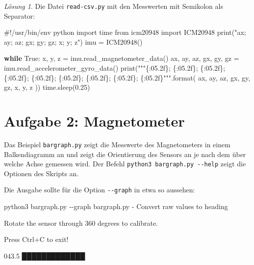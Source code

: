 \documentclass[
  11pt,
  a4paper,
  oneside, openany  ,captions=tableheading
]{scrbook}
\newenvironment{Shaded}{\begin{snugshade}}{\end{snugshade}}
\newcommand{\AttributeTok}[1]{\textcolor[rgb]{0.40,0.45,0.13}{#1}}
\newcommand{\BuiltInTok}[1]{\textcolor[rgb]{0.00,0.23,0.31}{#1}}
\newcommand{\CommentTok}[1]{\textcolor[rgb]{0.37,0.37,0.37}{#1}}
\newcommand{\ControlFlowTok}[1]{\textcolor[rgb]{0.00,0.23,0.31}{\textbf{#1}}}
\newcommand{\ExtensionTok}[1]{\textcolor[rgb]{0.00,0.23,0.31}{#1}}
\newcommand{\FloatTok}[1]{\textcolor[rgb]{0.68,0.00,0.00}{#1}}
\newcommand{\ImportTok}[1]{\textcolor[rgb]{0.00,0.46,0.62}{#1}}
\newcommand{\NormalTok}[1]{\textcolor[rgb]{0.00,0.23,0.31}{#1}}
\newcommand{\OperatorTok}[1]{\textcolor[rgb]{0.37,0.37,0.37}{#1}}
\newcommand{\SpecialCharTok}[1]{\textcolor[rgb]{0.37,0.37,0.37}{#1}}
\newcommand{\StringTok}[1]{\textcolor[rgb]{0.13,0.47,0.30}{#1}}
\newcommand{\VariableTok}[1]{\textcolor[rgb]{0.07,0.07,0.07}{#1}}
\theoremstyle{remark}
\newtheorem*{solution}{Lösung}
\renewcommand{\markright}[1]{\def\chaptertitle{#1}} %
\begin{document}
\begin{solution}
Die Datei \texttt{read-csv.py} mit den Messwerten mit Semikolon als
Separator:

\begin{Shaded}
\begin{Highlighting}[]
\CommentTok{\#!/usr/bin/env python}
\ImportTok{import}\NormalTok{ time}
\ImportTok{from}\NormalTok{ icm20948 }\ImportTok{import}\NormalTok{ ICM20948}
\BuiltInTok{print}\NormalTok{(}\StringTok{"ax; ay; az; gx; gy; gz; x; y; z"}\NormalTok{)}
\NormalTok{imu }\OperatorTok{=}\NormalTok{ ICM20948()}

\ControlFlowTok{while} \VariableTok{True}\NormalTok{:}
\NormalTok{    x, y, z }\OperatorTok{=}\NormalTok{ imu.read\_magnetometer\_data()}
\NormalTok{    ax, ay, az, gx, gy, gz }\OperatorTok{=}\NormalTok{ imu.read\_accelerometer\_gyro\_data()}
    \BuiltInTok{print}\NormalTok{(}\StringTok{"""}\SpecialCharTok{\{:05.2f\}}\StringTok{; }\SpecialCharTok{\{:05.2f\}}\StringTok{; }\SpecialCharTok{\{:05.2f\}}\StringTok{; }\SpecialCharTok{\{:05.2f\}}\StringTok{; }\SpecialCharTok{\{:05.2f\}}\StringTok{; }\SpecialCharTok{\{:05.2f\}}\StringTok{; }\SpecialCharTok{\{:05.2f\}}\StringTok{; }\SpecialCharTok{\{:05.2f\}}\StringTok{; }\SpecialCharTok{\{:05.2f\}}\StringTok{"""}\NormalTok{.}\BuiltInTok{format}\NormalTok{(}
\NormalTok{        ax, ay, az, gx, gy, gz, x, y, z ))}
\NormalTok{    time.sleep(}\FloatTok{0.25}\NormalTok{)}
\end{Highlighting}
\end{Shaded}

\end{solution}

\section*{Aufgabe 2: Magnetometer}\label{aufgabe-2-magnetometer}

\markright{Aufgabe 2: Magnetometer}

Das Beispiel \texttt{bargraph.py} zeigt die Messwerte des Magnetometers
in einem Balkendiagramm an und zeigt die Orientierung des Sensors an je
nach dem über welche Achse gemessen wird. Der Befehl
\texttt{python3\ bargraph.py\ -\/-help} zeigt die Optionen des Skripts
an.

Die Ausgabe sollte für die Option \texttt{-\/-graph} in etwa so
aussehen:

\begin{Shaded}
\begin{Highlighting}[]
\ExtensionTok{python3}\NormalTok{ bargraph.py }\AttributeTok{{-}{-}graph}
\ExtensionTok{bargraph.py} \AttributeTok{{-}}\NormalTok{ Convert raw values to heading}

\ExtensionTok{Rotate}\NormalTok{ the sensor through 360 degrees to calibrate.}

\ExtensionTok{Press}\NormalTok{ Ctrl+C to exit!}

\ExtensionTok{043.5}\NormalTok{ █████████████                                                                                                     }
\end{Highlighting}
\end{Shaded}
\end{document}
